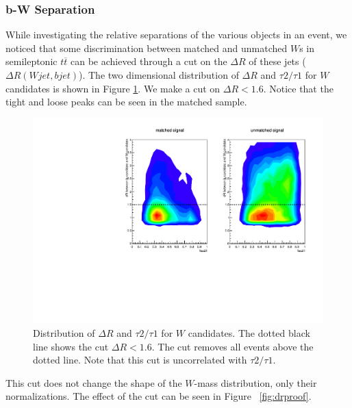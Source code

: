 \subsubsection{b-W Separation}
While investigating the relative separations of the various objects in an event, we noticed that some discrimination between matched and unmatched $W$s in semileptonic $t\overline{t}$ can be achieved through a cut on the $\Delta R$ of these jets ($\Delta R(Wjet, bjet)$). The two dimensional distribution of $\Delta R$ and $\tau 2/\tau 1$ for $W$ candidates is shown in Figure \ref{fig:drcut}. We make a cut on $\Delta R < 1.6$. Notice that the tight and loose peaks can be seen in the matched sample.
\begin{figure}[h!]
\centering
\includegraphics[scale=0.87]{EXO-12-024/figs/WtagSF/Z.pdf}
\caption{Distribution of $\Delta R$ and $\tau 2/\tau 1$ for $W$ candidates. The dotted black line shows the cut $\Delta R < 1.6$. The cut removes all events above the dotted line. Note that this cut is uncorrelated with $\tau 2/\tau 1$.}\label{fig:drcut}
\end{figure}
This cut does not change the shape of the $W$-mass distribution, only their normalizations. The effect of the cut can be seen in Figure~ \ref{fig:drproof}.
